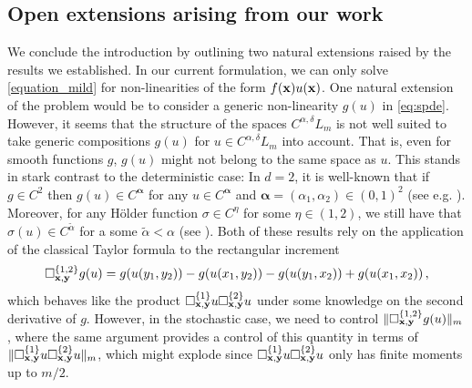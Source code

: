 \documentclass[12pt]{article}
\numberwithin{equation}{section}
\theoremstyle{plain}
\theoremstyle{definition}
\def\fy{\mathbf y}\def\fz{\mathbf z}
\def\falpha{{\boldsymbol\alpha}}
\begin{document}
\subsection{Open extensions arising from our work}\label{sec:OpenExtensions}

We conclude the introduction by outlining two natural extensions raised by the
results we established. In our current formulation, we can only solve \eqref{equation_mild} for non-linearities of the form $f(\mathbf x)u(\mathbf x)$. One natural extension of the problem would be to consider a generic non-linearity $g(u)$ in \eqref{eq:spde}. However, it seems that the structure of the spaces $C^{\alpha,\delta} L_m$ is not well suited to take generic compositions $g(u)$ for $u\in C^{\alpha,\delta} L_m$ into account. That is, even for smooth functions $g$, $g(u)$ might not belong to the same space as $u$. This stands in stark contrast to the deterministic case: In $d=2$, it is well-known that if $g\in C^2$ then  $g(u)\in C^\falpha$ for any $u\in C^\falpha$ and $\falpha=(\alpha_1, \alpha_2)\in (0,1)^2$ (see e.g. \cite[Lemma 3.1]{tindel07}). Moreover,  for any H\"older function $\sigma\in C^{\eta}$ for some $\eta\in(1,2)$, we still have that $\sigma(u)\in C^{\tilde\alpha}$ for a some $\tilde\alpha < \alpha$ (see \cite[Lemma 15]{bechtold2022}). Both of these results rely on the application of the classical Taylor formula to the rectangular increment
 \[
 \square^{\{1,2\}}_{\fx,\fy} g(u)=g(u(y_1,y_2))- g(u(x_1,y_2))- g(u(y_1,x_2)) + g(u(x_1,x_2))\,,
 \]
 which behaves like the product $\square^{\{1\}}_{\fx,\fy} u \square^{\{2\}}_{\fx,\fy} u$ under some knowledge on the second derivative of $g$. However, in the stochastic case, we need  to control $\Vert \square^{\{1,2\}}_{\fx,\fy} g(u)\Vert_m$, where the same argument provides a control of this quantity  in terms of  $\Vert\square^{\{1\}}_{\fx,\fy} u \square^{\{2\}}_{\fx,\fy} u \Vert_m$, which might explode since $\square^{\{1\}}_{\fx,\fy} u \square^{\{2\}}_{\fx,\fy} u$ only has finite moments up to  $m/2$.
 
\end{document}
